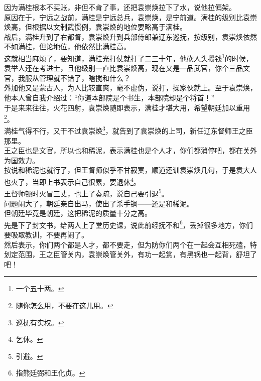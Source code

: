 \begin{multicols}{\theparacolNo}
因为满桂根本不买账，非但不肯了事，还把袁崇焕拉下了水，说他拉偏架。\\

原因在于，宁远之战前，满桂是宁远总兵，袁崇焕，是宁前道。满桂的级别比袁崇焕高，但根据以文制武惯例，袁崇焕的地位要略高于满桂。\\

战后，满桂升到了右都督，袁崇焕升到兵部侍郎兼辽东巡抚，按级别，袁崇焕依然不如满桂，但论地位，他依然比满桂高。\\

这就相当麻烦了，要知道，满桂光打仗就打了二三十年，他砍人头攒钱\footnote{一个五十两。}的时候，袁举人还在考进士，且他级别一直比袁崇焕高，现在又是一品武官，你个三品文官，我服从管理就不错了，瞎搅和什么？\\

外加他又是蒙古人，为人比较直爽，毫不虚伪，说打，操家伙就上。至于袁崇焕，他本人曾自我介绍过：“你道本部院是个书生，本部院却是个将首！”\\

于是来来往往，火花四射，袁崇焕随即表示，满桂才堪大用，希望朝廷加以重用\footnote{随你怎么用，不要在这儿用。}。\\

满桂气得不行，又干不过袁崇焕\footnote{巡抚有实权。}，就告到了袁崇焕的上司，新任辽东督师王之臣那里。\\

王之臣也是文官，所以也和稀泥，表示满桂也是个人才，你们都消停吧，都在关外为国效力。\\

按说和稀泥也就行了，但王督师似乎不甘寂寞，顺道还训袁崇焕几句，于是袁大人也火了，当即上书表示自己很累，要退休\footnote{乞休。}。\\

王督师顿时火冒三丈，也上了奏疏，说自己要引退\footnote{引避。}。\\

问题闹大了，朝廷亲自出马，使出了杀手锏——还是和稀泥。\\

但朝廷毕竟是朝廷，这把稀泥的质量十分之高。\\

先是下了封文书，给两人上了堂历史课，说此前经抚不和\footnote{指熊廷弼和王化贞。}，丢掉很多地方，你们要吸取教训，不要再闹了。\\

然后表示，你们两个都是人才，都不要走，但为防你们两个在一起会互相死磕，特划定范围，王之臣管关内，袁崇焕管关外，有功一起赏，有黑锅也一起背，舒坦了吧！\\


\end{multicols}
